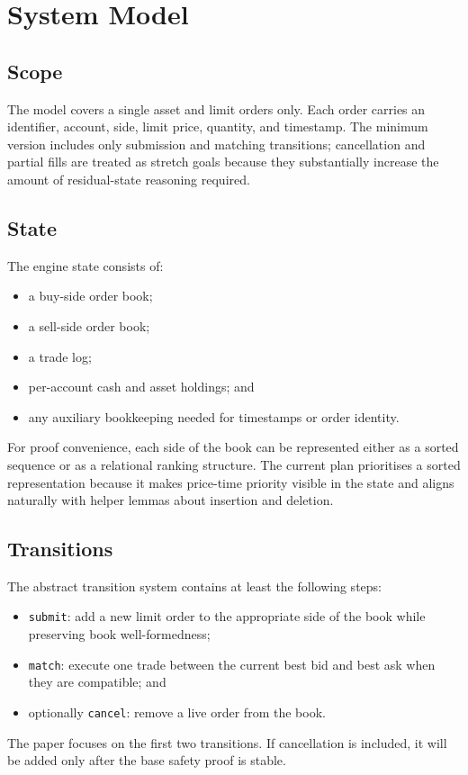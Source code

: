 \section{System Model}

\subsection{Scope}

The model covers a single asset and limit orders only. Each order carries an
identifier, account, side, limit price, quantity, and timestamp. The minimum
version includes only submission and matching transitions; cancellation and
partial fills are treated as stretch goals because they substantially increase
the amount of residual-state reasoning required.

\subsection{State}

The engine state consists of:

\begin{itemize}[leftmargin=1.5em]
\item a buy-side order book;
\item a sell-side order book;
\item a trade log;
\item per-account cash and asset holdings; and
\item any auxiliary bookkeeping needed for timestamps or order identity.
\end{itemize}

For proof convenience, each side of the book can be represented either as a
sorted sequence or as a relational ranking structure. The current plan
prioritises a sorted representation because it makes price-time priority
visible in the state and aligns naturally with helper lemmas about insertion
and deletion.

\subsection{Transitions}

The abstract transition system contains at least the following steps:

\begin{itemize}[leftmargin=1.5em]
\item \texttt{submit}: add a new limit order to the appropriate side of the
book while preserving book well-formedness;
\item \texttt{match}: execute one trade between the current best bid and best
ask when they are compatible; and
\item optionally \texttt{cancel}: remove a live order from the book.
\end{itemize}

The paper focuses on the first two transitions. If cancellation is included,
it will be added only after the base safety proof is stable.
